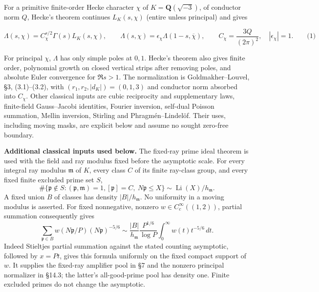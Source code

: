 For a primitive finite-order Hecke character \(\chi\) of \(K=\mathbf Q(\sqrt{-3})\), of conductor norm \(Q\), Hecke's theorem continues \(L_K(s,\chi)\) (entire unless principal) and gives

\hypertarget{cf:hecke-classical}{}

\label{cf:hecke-classical}

\[
\Lambda(s,\chi)=C_\chi^{s/2}\Gamma(s)L_K(s,\chi),\qquad
\Lambda(s,\chi)=\epsilon_\chi\Lambda(1-s,\overline\chi),\qquad
C_\chi=\frac{3Q}{(2\pi)^2},\quad |\epsilon_\chi|=1.
\qquad\text{(1)}
\]

For principal \(\chi\), \(\Lambda\) has only simple poles at \(0,1\). Hecke's theorem also gives finite order, polynomial growth on closed vertical strips after removing poles, and absolute Euler convergence for \(\Re s>1\). The normalization is Goldmakher--Louvel, §3, (3.1)--(3.2), with \((r_1,r_2,|d_K|)=(0,1,3)\) and conductor norm absorbed into \(C_\chi\). Other classical inputs are cubic reciprocity and supplementary laws, finite-field Gauss--Jacobi identities, Fourier inversion, self-dual Poisson summation, Mellin inversion, Stirling and Phragmén--Lindelöf. Their uses, including moving masks, are explicit below and assume no sought zero-free boundary.

\hypertarget{cf:prime-supply-and-boundary}{}

\label{cf:prime-supply-and-boundary}

\textbf{Additional classical inputs used below.} The fixed-ray prime ideal theorem is used with the field and ray modulus fixed before the asymptotic scale. For every integral ray modulus \(\mathfrak m\) of \(K\), every class \(C\) of its finite ray-class group, and every fixed finite excluded prime set \(S\), \[
\#\{\mathfrak p\notin S:(\mathfrak p,\mathfrak m)=1,
 [\mathfrak p]=C,\ N\mathfrak p\le X\}
\sim \operatorname{Li}(X)/h_{\mathfrak m}.
\] A fixed union \(B\) of classes has density \(|B|/h_{\mathfrak m}\). No uniformity in a moving modulus is asserted. For fixed nonnegative, nonzero \(w\in C_c^\infty((1,2))\), partial summation consequently gives \[
\sum_{\mathfrak p\in B} w(N\mathfrak p/P)(N\mathfrak p)^{-5/6}
\sim \frac{|B|}{h_{\mathfrak m}}\frac{P^{1/6}}{\log P}
 \int_0^\infty w(t)t^{-5/6}\,dt.
\] Indeed Stieltjes partial summation against the stated counting asymptotic, followed by \(x=Pt\), gives this formula uniformly on the fixed compact support of \(w\). It supplies the fixed-ray amplifier pool in §7 and the nonzero principal normalizer in §14.3; the latter's all-good-prime pool has density one. Finite excluded primes do not change the asymptotic.

